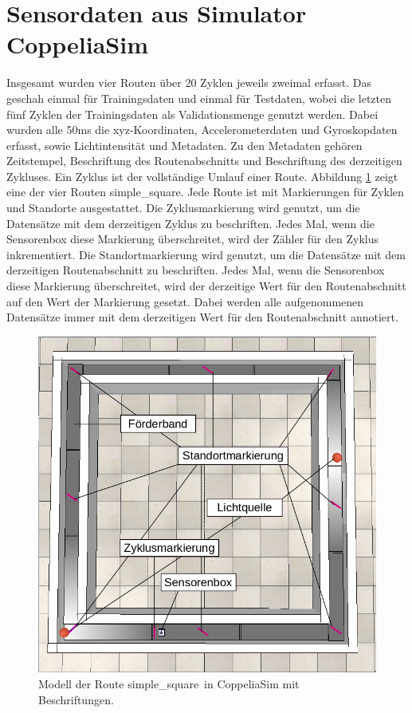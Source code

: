 \section{Sensordaten aus Simulator CoppeliaSim}
Insgesamt wurden vier Routen über 20 Zyklen jeweils zweimal erfasst.
Das geschah einmal für Trainingsdaten und einmal für Testdaten, wobei die letzten fünf Zyklen der
Trainingsdaten als Validationsmenge genutzt werden.
Dabei wurden alle 50ms die xyz-Koordinaten, Accelerometerdaten und Gyroskopdaten erfasst, sowie Lichtintensität und Metadaten.
Zu den Metadaten gehören Zeitstempel, Beschriftung des Routenabschnitts und Beschriftung des derzeitigen Zykluses.
Ein Zyklus ist der vollständige Umlauf einer Route.
\newpage
Abbildung \ref{fig:simple_square_labeled} zeigt eine der vier Routen \glqq simple\_square\grqq.
Jede Route ist mit Markierungen für Zyklen und Standorte ausgestattet.
Die Zyklusmarkierung wird genutzt, um die Datensätze mit dem derzeitigen Zyklus zu beschriften.
Jedes Mal, wenn die Sensorenbox diese Markierung überschreitet, wird der Zähler für den Zyklus inkrementiert.
Die Standortmarkierung wird genutzt, um die Datensätze mit dem derzeitigen Routenabschnitt zu beschriften.
Jedes Mal, wenn die Sensorenbox diese Markierung überschreitet, wird der derzeitige Wert für den Routenabschnitt auf den Wert der Markierung gesetzt.
Dabei werden alle aufgenommenen Datensätze immer mit dem derzeitigen Wert für den Routenabschnitt annotiert.
\begin{figure}[h!]
    \centering
    \includegraphics[width=0.75\linewidth]{images/simple_square_labeled.png}
    \caption{Modell der Route \glqq simple\_square\grqq\ in CoppeliaSim mit Beschriftungen.}
    \label{fig:simple_square_labeled}
\end{figure}
